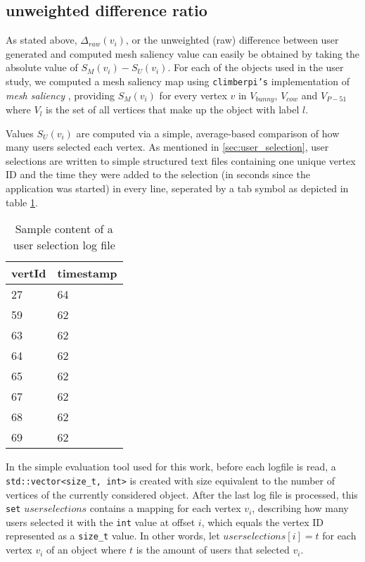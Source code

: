 		\subsection{unweighted difference ratio}
		\label{sec:unweighted_difference_ratio}
As stated above, $\Delta_{raw}(v_i)$, or the unweighted (raw) difference between user generated and computed mesh saliency value can easily be obtained by taking the absolute value of $S_{M}(v_i) - S_{U}(v_i)$. For each of the objects used in the user study, we computed a mesh saliency map using \texttt{climberpi's} implementation of \textit{mesh saliency} \cite{clms}, providing $S_{M}(v_i)$ for every vertex $v$ in $V_{bunny}$, $V_{cow}$ and $V_{P-51}$ where $V_{l}$ is the set of all vertices that make up the object with label $l$.

Values $S_{U}(v_i)$ are computed via a simple, average-based comparison of how many users selected each vertex. As mentioned in \ref{sec:user_selection}, user selections are written to simple structured text files containing one unique vertex ID and the time they were added to the selection (in seconds since the application was started) in every line, seperated by a tab symbol as depicted in table \ref{tab:user_selection_log_file}.

\begin{table}[]
\centering
	\begin{tabular}{l|l}
	vertId & timestamp \\ \hline
	27 & 64 \\
	59 & 62 \\
	63 & 62 \\
	64 & 62 \\
	65 & 62 \\
	67 & 62 \\
	68 & 62 \\
	69 & 62
	\end{tabular}
	\caption{Sample content of a user selection log file}
	\label{tab:user_selection_log_file}
\end{table}

In the simple evaluation tool used for this work, before each logfile is read, a \texttt{std::vector<size\_t, int>} is created with size equivalent to the number of vertices of the currently considered object. After the last log file is processed, this \texttt{set} $userselections$ contains a mapping for each vertex $v_i$, describing how many users selected it with the \texttt{int} value at offset $i$, which equals the vertex ID represented as a \texttt{size\_t} value. In other words, let $userselections[i] = t$ for each vertex $v_i$ of an object where $t$ is the amount of users that selected $v_i$.

